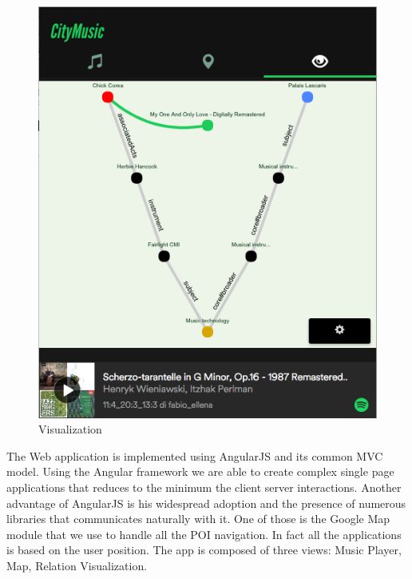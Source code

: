 \documentclass[paper=a4, fontsize=11pt]{scrartcl}
\begin{document}
\begin{figure}[!htb]
\begin{minipage}[t]{0.45\textwidth}
\includegraphics[width=\linewidth]{images/Visualization_2.png}
\caption{Visualization}
\label{fig:visualization}
\end{minipage}

\end{figure}
The Web application is implemented using AngularJS and its common MVC model. Using the Angular framework we are able to create complex single page applications that reduces to the minimum the client server interactions. Another advantage of AngularJS is his widespread adoption and the presence of numerous libraries that communicates naturally with it. One of those is the Google Map module that we use to handle all the POI navigation. In fact all the applications is based on the user position.
The app is composed of three views: Music Player, Map, Relation Visualization.
\end{document}
